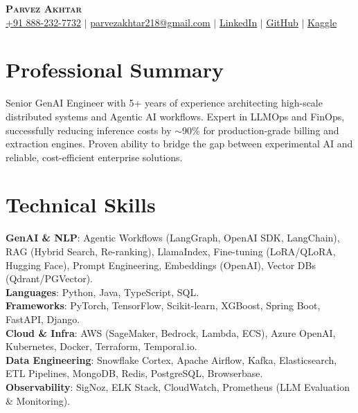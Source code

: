 \documentclass[11pt,a4paper]{article}
\begin{document}
\begin{center}
    \textbf{\Huge \scshape Parvez Akhtar} \\ \vspace{1pt}
    \small \href{tel:+918882327732}{+91 888-232-7732} $|$ \href{mailto:parvezakhtar218@gmail.com}{\underline{parvezakhtar218@gmail.com}} $|$ 
    \href{https://www.linkedin.com/in/parvezakhtar/}{\underline{LinkedIn}} $|$
    \href{https://github.com/ipmob}{\underline{GitHub}} $|$
    \href{https://www.kaggle.com/parvez218}{\underline{Kaggle}}
\end{center}

\section{Professional Summary}
\small{Senior GenAI Engineer with 5+ years of experience architecting high-scale distributed systems and Agentic AI workflows. Expert in LLMOps and FinOps, successfully reducing inference costs by $\sim$90\% for production-grade billing and extraction engines. Proven ability to bridge the gap between experimental AI and reliable, cost-efficient enterprise solutions.}

\section{Technical Skills}
 \begin{itemize}[leftmargin=0.15in, label={}]
    \small{\item{
     \textbf{GenAI \& NLP}{: Agentic Workflows (LangGraph, OpenAI SDK, LangChain), RAG (Hybrid Search, Re-ranking), LlamaIndex, Fine-tuning (LoRA/QLoRA, Hugging Face), Prompt Engineering, Embeddings (OpenAI), Vector DBs (Qdrant/PGVector).} \\
     \textbf{Languages}{: Python, Java, TypeScript, SQL.} \\
     \textbf{Frameworks}{: PyTorch, TensorFlow, Scikit-learn, XGBoost, Spring Boot, FastAPI, Django.} \\
     \textbf{Cloud \& Infra}{: AWS (SageMaker, Bedrock, Lambda, ECS), Azure OpenAI, Kubernetes, Docker, Terraform, Temporal.io.} \\
     \textbf{Data Engineering}{: Snowflake Cortex, Apache Airflow, Kafka, Elasticsearch, ETL Pipelines, MongoDB, Redis, PostgreSQL, Browserbase.} \\
     \textbf{Observability}{: SigNoz, ELK Stack, CloudWatch, Prometheus (LLM Evaluation \& Monitoring).}
    }}
 \end{itemize}
\end{document}
